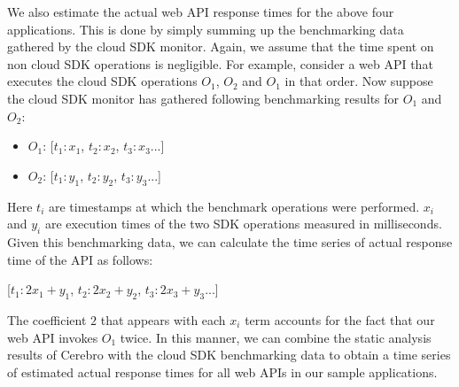 We also estimate the actual web API response times for the above four applications. 
This is done by simply summing up the benchmarking data gathered by the cloud 
SDK monitor. Again, we assume that the time spent on non cloud SDK operations
is negligible. For example,
consider a web API that executes the cloud SDK operations $O_{1}$, $O_{2}$ and $O_{1}$ in that order. 
Now suppose the cloud SDK monitor has gathered following benchmarking results for $O_{1}$ and
$O_{2}$:

\begin{itemize}
\item $O_{1}$: [$t_{1}:x_{1}$, $t_{2}:x_{2}$, $t_{3}:x_{3}$...]
\item $O_{2}$: [$t_{1}:y_{1}$, $t_{2}:y_{2}$, $t_{3}:y_{3}$...]
\end{itemize}

Here $t_{i}$ are timestamps at which the benchmark operations were performed. $x_{i}$ and $y_{i}$ are
execution times of the two SDK operations measured in milliseconds. Given this benchmarking data,
we can calculate the time series of actual response time of the API as follows:

[$t_{1}:2x_{1}+y_{1}$, $t_{2}:2x_{2}+y_{2}$, $t_{3}:2x_{3}+y_{3}$...]

The coefficient $2$ that appears with each $x_{i}$ term accounts for the fact that our web API
invokes $O_{1}$ twice. In this manner, we can combine the static analysis
results of Cerebro with the cloud SDK benchmarking data to obtain a time series of estimated
actual response times for all web APIs in our sample applications.

